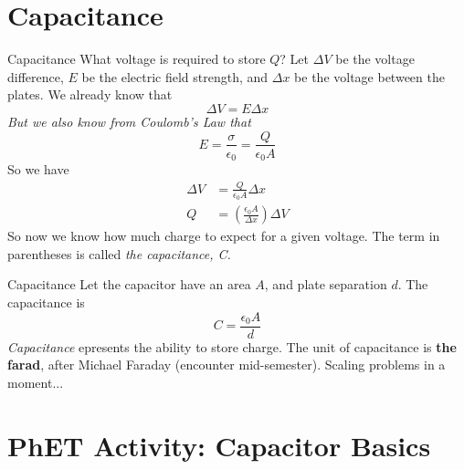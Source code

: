 \documentclass{beamer}
\begin{document}
\section{Capacitance}

\begin{frame}{Capacitance}
What voltage is required to store $Q$? Let $\Delta V$ be the voltage difference, $E$ be the electric field strength, and $\Delta x$ be the voltage between the plates.  We already know that
\begin{equation}
\Delta V = E\Delta x
\end{equation}
\textit{But we also know from Coulomb's Law that}
\begin{equation}
E = \frac{\sigma}{\epsilon_0} = \frac{Q}{\epsilon_0 A}
\end{equation}
So we have
\begin{align}
\Delta V &= \frac{Q}{\epsilon_0 A}\Delta x \\
Q &= \left( \frac{\epsilon_0 A}{\Delta x} \right) \Delta V
\end{align}
So now we know how much charge to expect for a given voltage.  The term in parentheses is called \textit{the capacitance, C.}
\end{frame}

\begin{frame}{Capacitance}
Let the capacitor have an area $A$, and plate separation $d$.  The capacitance is
\begin{equation}
\boxed{
C = \frac{\epsilon_0 A}{d}}
\end{equation}
\textit{Capacitance} epresents the ability to store charge.  The unit of capacitance is \textbf{the farad}, after Michael Faraday (encounter mid-semester).  Scaling problems in a moment...
\end{frame}

\section{PhET Activity: Capacitor Basics}
\end{document}

